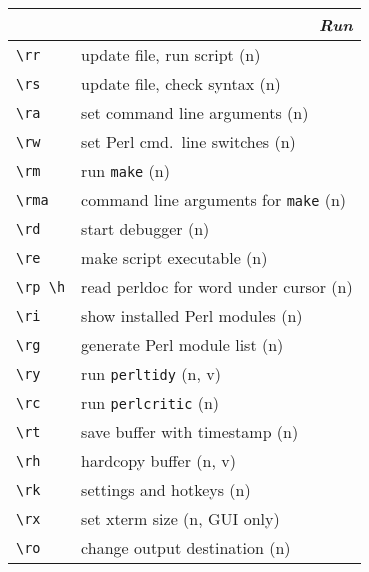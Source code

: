 \documentclass[oneside,10pt,landscape,DIV17]{scrartcl}
\begin{document}
\begin{multicols}{2}
%
\begin{tabular}[]{|p{11mm}|p{58mm}|}
\hline
\multicolumn{2}{|r|}{\textsl{\textbf{R}un}} \\[1.0ex]
\hline \verb'\rr'    & update file, run script                  \hfill (n)   \\
\hline \verb'\rs'    & update file, check syntax                \hfill (n)   \\
\hline \verb'\ra'    & set command line arguments               \hfill (n)   \\
\hline \verb'\rw'    & set Perl cmd.\ line switches             \hfill (n)   \\
\hline \verb'\rm'    & run \texttt{make}                        \hfill (n)   \\
\hline \verb'\rma'   & command line arguments for \texttt{make} \hfill (n)   \\
\hline \verb'\rd'    & start debugger                           \hfill (n)   \\
\hline \verb'\re'    & make script executable                   \hfill (n)   \\
\hline \verb'\rp \h' & read perldoc for word under cursor       \hfill (n)   \\
\hline \verb'\ri'    & show installed Perl modules              \hfill (n)   \\
\hline \verb'\rg'    & generate Perl module list                \hfill (n)   \\
\hline \verb'\ry'    & run \verb'perltidy'                      \hfill (n, v)\\
\hline \verb'\rc'    & run \verb'perlcritic'                    \hfill (n)   \\
\hline \verb'\rt'    & save buffer with timestamp               \hfill (n)   \\
\hline \verb'\rh'    & hardcopy buffer                          \hfill (n, v)\\
\hline \verb'\rk'    & settings and hotkeys                     \hfill (n)   \\
\hline \verb'\rx'    & set xterm size                           \hfill (n, {\tiny GUI only})\\
\hline \verb'\ro'    & change output destination                \hfill (n)   \\
\hline
\end{tabular}%
%


\end{multicols}
\end{document}
